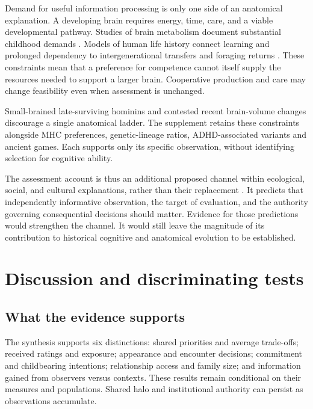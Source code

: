 Demand for useful information processing is only one side of an anatomical explanation. A developing brain requires energy, time, care, and a viable developmental pathway. Studies of brain metabolism document substantial childhood demands \citep{kuzawa2014}. Models of human life history connect learning and prolonged dependency to intergenerational transfers and foraging returns \citep{kaplan2000}. These constraints mean that a preference for competence cannot itself supply the resources needed to support a larger brain. Cooperative production and care may change feasibility even when assessment is unchanged.



Small-brained late-surviving hominins and contested recent brain-volume changes discourage a single anatomical ladder. The supplement retains these constraints alongside MHC preferences, genetic-lineage ratios, ADHD-associated variants and ancient games. Each supports only its specific observation, without identifying selection for cognitive ability.

The assessment account is thus an additional proposed channel within ecological, social, and cultural explanations, rather than their replacement \citep{dunbar1998,cultural,gonzalezforero2018}. It predicts that independently informative observation, the target of evaluation, and the authority governing consequential decisions should matter. Evidence for those predictions would strengthen the channel. It would still leave the magnitude of its contribution to historical cognitive and anatomical evolution to be established.

\section{Discussion and discriminating tests}\label{sec:minds-discussion}

\subsection{What the evidence supports}

The synthesis supports six distinctions: shared priorities and average trade-offs; received ratings and exposure; appearance and encounter decisions; commitment and childbearing intentions; relationship access and family size; and information gained from observers versus contexts. These results remain conditional on their measures and populations. Shared halo and institutional authority can persist as observations accumulate.

